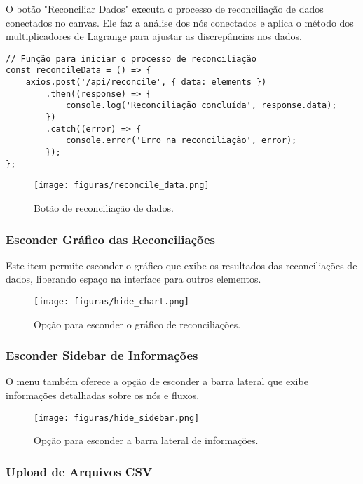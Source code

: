 O botão "Reconciliar Dados" executa o processo de reconciliação de dados conectados no canvas. Ele faz a análise dos nós conectados e aplica o método dos multiplicadores de Lagrange para ajustar as discrepâncias nos dados.

\begin{verbatim}
// Função para iniciar o processo de reconciliação
const reconcileData = () => {
    axios.post('/api/reconcile', { data: elements })
        .then((response) => {
            console.log('Reconciliação concluída', response.data);
        })
        .catch((error) => {
            console.error('Erro na reconciliação', error);
        });
};
\end{verbatim}

\begin{figure}[htbp]
    \centering
    \texttt{[image: figuras/reconcile\_data.png]}
    \caption{Botão de reconciliação de dados.}
    \label{Fig:ReconcileData}
\end{figure}

\subsubsection{Esconder Gráfico das Reconciliações}

Este item permite esconder o gráfico que exibe os resultados das reconciliações de dados, liberando espaço na interface para outros elementos.

\begin{figure}[htbp]
    \centering
    \texttt{[image: figuras/hide\_chart.png]}
    \caption{Opção para esconder o gráfico de reconciliações.}
    \label{Fig:HideChart}
\end{figure}

\subsubsection{Esconder Sidebar de Informações}

O menu também oferece a opção de esconder a barra lateral que exibe informações detalhadas sobre os nós e fluxos.

\begin{figure}[htbp]
    \centering
    \texttt{[image: figuras/hide\_sidebar.png]}
    \caption{Opção para esconder a barra lateral de informações.}
    \label{Fig:HideSidebar}
\end{figure}

\subsubsection{Upload de Arquivos CSV}

